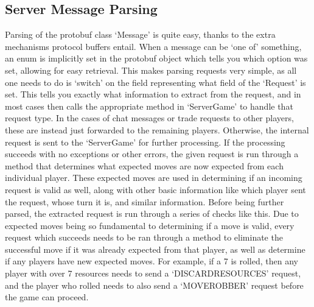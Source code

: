 \documentclass[a4paper,doc,draftfirst]{apa6}
\begin{document}
\subsection{Server Message Parsing}
Parsing of the protobuf class ‘Message’ is quite easy, thanks to the extra mechanisms protocol buffers entail. When a message can be ‘one of’ something, an enum is implicitly set in the protobuf object which tells you which option was set, allowing for easy retrieval. This makes parsing requests very simple, as all one needs to do is ‘switch’ on the field representing what field of the ‘Request’ is set. This tells you exactly what information to extract from the request, and in most cases then calls the appropriate method in ‘ServerGame’ to handle that request type. In the cases of chat messages or trade requests to other players, these are instead just forwarded to the remaining players. Otherwise, the internal request is sent to the ‘ServerGame’ for further processing. If the processing succeeds with no exceptions or other errors, the given request is run through a method that determines what expected moves are now expected from each individual player. These expected moves are used in determining if an incoming request is valid as well, along with other basic information like which player sent the request, whose turn it is, and similar information. Before being further parsed, the extracted request is run through a series of checks like this. Due to expected moves being so fundamental to determining if a move is valid, every request  which succeeds needs to be ran through a method to eliminate the successful move if it was already expected from that player, as well as determine if any players have new expected moves. For example, if a 7 is rolled, then any player with over 7 resources needs to send a ‘DISCARDRESOURCES’ request, and the player who rolled needs to also send a ‘MOVEROBBER’ request before the game can proceed.
\end{document}
